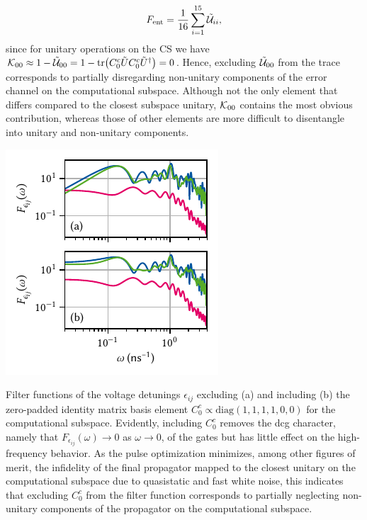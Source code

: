 \begin{equation}
    F_{\mathrm{ent}} = \frac{1}{16}\sum_{i=1}^{15}\mathcal{\tilde{U}}_{ii},
\end{equation}
since for unitary operations on the CS we have $\mathcal{K}_{00} \approx 1 - \mathcal{\tilde{U}}_{00} = 1 - \mathrm{tr}\bigl(C_0^c\tilde{U} C_0^c\tilde{U}^\dagger\bigr) = 0$.
Hence, excluding $\mathcal{\tilde{U}}_{00}$ from the trace corresponds to partially disregarding non-unitary components of the error channel on the computational subspace.
Although not the only element that differs compared to the closest subspace unitary, $\mathcal{K}_{00}$ contains the most obvious contribution, whereas those of other elements are more difficult to disentangle into unitary and non-unitary components.

\begin{marginfigure}
    \centering
    \includegraphics{img/pdf/filter_functions/CNOT_FF_unitary_v_complete}
    \caption[]{
        Filter functions of the voltage detunings $\epsilon_{ij}$ excluding (a) and including (b) the zero-padded identity matrix basis element $C_0^c\propto\text{diag}(1,1,1,1,0,0)$ for the computational subspace.
        Evidently, including $C_0^c$ removes the \gls{dcg} character, namely that $F_{\epsilon_{ij}}(\omega)\rightarrow 0$ as $\omega\rightarrow 0$, of the gates but has little effect on the high-frequency behavior.
        As the pulse optimization minimizes, among other figures of merit, the infidelity of the final propagator mapped to the closest unitary on the computational subspace due to quasistatic and fast white noise, this indicates that excluding $C_0^c$ from the filter function corresponds to partially neglecting non-unitary components of the propagator on the computational subspace.
    }
    \label{fig:app:ff:filter_function:cnot}
\end{marginfigure}

